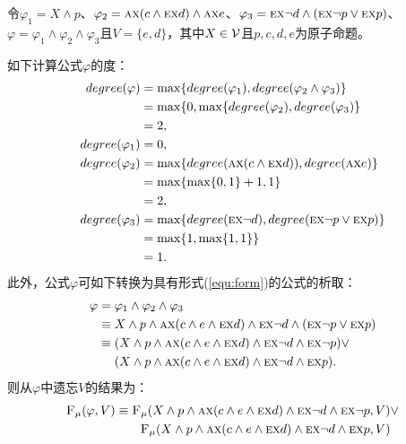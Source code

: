 \begin{example}
	\label{exp:x-class}
	令$\varphi_1 = X \wedge p$、$\varphi_2 = \textsc{a}\textsc{x}(c \wedge \textsc{e}\textsc{x} d) \wedge \textsc{a}\textsc{x} e$、$\varphi_3 = \textsc{e}\textsc{x} \neg d \wedge (\textsc{e}\textsc{x} \neg p \vee \textsc{e}\textsc{x} p)$、$\varphi = \varphi_1 \wedge \varphi_2 \wedge \varphi_3$且$V = \{e,d\}$，其中$X \in {\cal V}$且$p, c, d, e$为原子命题。
	
	如下计算公式$\varphi$的度：
	\begin{align*}
		degree(\varphi) &  =  \max\{degree(\varphi_1), degree(\varphi_2 \wedge \varphi_3)\}\\
		& = \max\{0, \max\{degree(\varphi_2), degree(\varphi_3)\}\\
		& = 2,\\
		degree(\varphi_1) & = 0,\\
		degree(\varphi_2) & = \max\{degree(\textsc{a}\textsc{x}(c \wedge \textsc{e}\textsc{x} d)), degree(\textsc{a}\textsc{x} e)\}\\
		& =\max\{\max\{0, 1\} + 1, 1\}\\
		& = 2,\\
		degree(\varphi_3) & = \max\{degree(\textsc{e}\textsc{x} \neg d), degree(\textsc{e}\textsc{x} \neg p \vee \textsc{e}\textsc{x} p)\}\\
		& = \max\{1, \max\{1,1\}\}\\
		& = 1.
	\end{align*}
	此外，公式$\varphi$可如下转换为具有形式(\ref{equ:form})的公式的析取：
	\begin{align*}
		\varphi & = \varphi_1 \wedge \varphi_2 \wedge \varphi_3\\
		& \equiv X \wedge p \wedge \textsc{a}\textsc{x}(c \wedge e \wedge \textsc{e}\textsc{x} d) \wedge \textsc{e}\textsc{x} \neg d \wedge (\textsc{e}\textsc{x} \neg p \vee \textsc{e}\textsc{x} p)\\
		& \equiv (X \wedge p \wedge \textsc{a}\textsc{x}(c \wedge e \wedge \textsc{e}\textsc{x} d) \wedge \textsc{e}\textsc{x} \neg d \wedge \textsc{e}\textsc{x} \neg p) \vee\\
		& \quad\ (X \wedge p \wedge \textsc{a}\textsc{x}(c \wedge e \wedge \textsc{e}\textsc{x} d) \wedge \textsc{e}\textsc{x} \neg d \wedge \textsc{e}\textsc{x}  p).
	\end{align*}
	则从$\varphi$中遗忘$V$的结果为：
	\begin{align*}
		\Muforget(\varphi,V) & \equiv \Muforget(X \wedge p \wedge \ALL\NEXT(c \wedge e \wedge \EXIST\NEXT d) \wedge \EXIST\NEXT \neg d \wedge \EXIST\NEXT \neg p, V) \vee \\
		& \qquad \Muforget(X \wedge p \wedge \ALL\NEXT(c \wedge e \wedge \EXIST\NEXT d) \wedge \EXIST\NEXT \neg d \wedge \EXIST\NEXT  p,V) \\

\end{align*}
\end{example}
